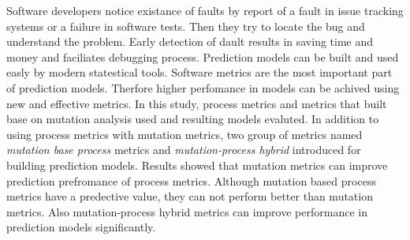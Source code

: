
Software developers notice existance of  faults by report of a fault in issue  tracking systems  or a failure in software tests. Then they try to locate the bug and understand the problem. Early detection of dault results in saving time and money and faciliates debugging process. Prediction models can be built and used easly by modern statestical tools. Software metrics are the most important part of prediction models. Therfore higher perfomance in models can be achived using new and effective metrics. In this study, process metrics and metrics that built base on mutation analysis used and resulting models evaluted. In addition to using process metrics with mutation metrics, two group of metrics named \textit{mutation base process}  metrics and \textit{mutation-process hybrid} introduced for building prediction models. Results showed that  mutation metrics can improve prediction prefromance of process metrics. Although mutation based process metrics have a predective value, they can not perform better than mutation metrics. Also mutation-process hybrid metrics can improve performance in prediction models significantly. 